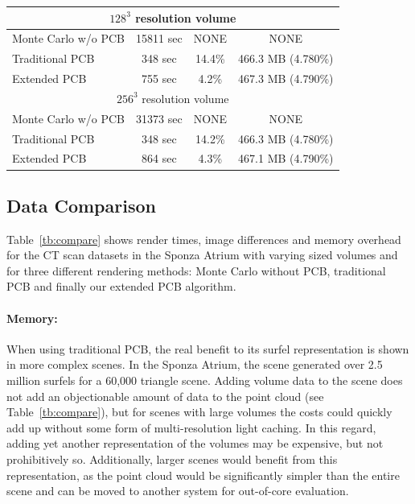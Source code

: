\documentclass[runningheads]{llncs}
\begin{document}
\begin{table}
\begin{center}
\begin{tabular}[b]{ | l | c | c | c | }
  \hline
  \multicolumn{4}{|c|}{$128^3$ resolution volume} \\     
  \hline            
             
  Monte Carlo w/o PCB & 15811 sec & NONE & NONE \\
  Traditional PCB & 348 sec & 14.4\% & 466.3 MB (4.780\%) \\
  Extended PCB & 755 sec & 4.2\% & 467.3 MB (4.790\%)  \\

  \hline
  \multicolumn{4}{|c|}{$256^3$ resolution volume} \\     
  \hline            
             
  Monte Carlo w/o PCB & 31373 sec & NONE & NONE \\
  Traditional PCB & 348 sec & 14.2\% & 466.3 MB (4.780\%) \\
  Extended PCB & 864 sec & 4.3\% & 467.1 MB (4.790\%)  \\
  \hline  
\end{tabular}
\end{center}
\end{table}
\setlength{\tabcolsep}{1.4pt}

\subsection{Data Comparison}

Table~\ref{tb:compare} shows render times, image differences and memory overhead for the CT scan datasets in the Sponza Atrium with varying sized volumes and for three different rendering methods: Monte Carlo without PCB, traditional PCB and finally our extended PCB algorithm.


\paragraph{Memory:}
When using traditional PCB, the real benefit to its surfel representation is shown in more complex scenes.  In the Sponza Atrium, the scene generated over 2.5 million surfels for a 60,000 triangle scene.  Adding volume data to the scene does not add an objectionable amount of data to the point cloud (see Table~\ref{tb:compare}), but for scenes with large volumes the costs could quickly add up without some form of multi-resolution light caching.  In this regard, adding yet another representation of the volumes may be expensive, but not prohibitively so.  Additionally, larger scenes would benefit from this representation, as the point cloud would be significantly simpler than the entire scene and can be moved to another system for out-of-core evaluation.
\end{document}
